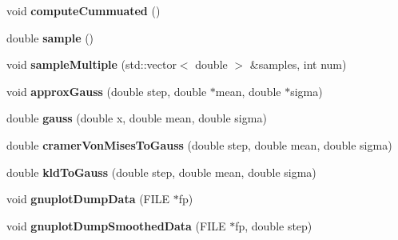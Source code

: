 \begin{DoxyCompactItemize}
void {\bfseries compute\+Cummuated} ()
\item 
\mbox{\label{classGMapping_1_1DataSmoother_aef590500a20262e39b8ddfca895f32ab}} 
double {\bfseries sample} ()
\item 
\mbox{\label{classGMapping_1_1DataSmoother_a85a3ddc9bb89b3cdc98e5e6f466af9c3}} 
void {\bfseries sample\+Multiple} (std\+::vector$<$ double $>$ \&samples, int num)
\item 
\mbox{\label{classGMapping_1_1DataSmoother_ab17bd459ddb31d4b0a446277add46a55}} 
void {\bfseries approx\+Gauss} (double step, double $\ast$mean, double $\ast$sigma)
\item 
\mbox{\label{classGMapping_1_1DataSmoother_a81456c2d6646b4679cc232438593d5e5}} 
double {\bfseries gauss} (double x, double mean, double sigma)
\item 
\mbox{\label{classGMapping_1_1DataSmoother_a63315101db777165a5a20aad9a245cfe}} 
double {\bfseries cramer\+Von\+Mises\+To\+Gauss} (double step, double mean, double sigma)
\item 
\mbox{\label{classGMapping_1_1DataSmoother_ac33a9eb24cc4b2ba35e80af877d6812e}} 
double {\bfseries kld\+To\+Gauss} (double step, double mean, double sigma)
\item 
\mbox{\label{classGMapping_1_1DataSmoother_af87d3a17873cc689926c1a6e0b0b7a00}} 
void {\bfseries gnuplot\+Dump\+Data} (F\+I\+LE $\ast$fp)
\item 
\mbox{\label{classGMapping_1_1DataSmoother_a6f9fdabb800528d8b0fe15f62a9214ef}} 
void {\bfseries gnuplot\+Dump\+Smoothed\+Data} (F\+I\+LE $\ast$fp, double step)
\end{DoxyCompactItemize}
